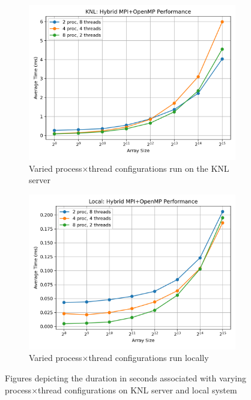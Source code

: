 \documentclass[11pt]{article}
\begin{document}
\begin{figure}
\centering
\begin{subfigure}[t]{0.48\textwidth}
  \centering
    \includegraphics[width=\textwidth]{./images/knlq7.png}
  \caption{Varied process$\times$thread configurations run on the KNL server}\label{fig:knlq7}
\end{subfigure}%
\hfill
\begin{subfigure}[t]{0.48\textwidth}
  \centering
    \includegraphics[width=\textwidth]{./images/localq7.png}
  \caption{Varied process$\times$thread configurations run locally}\label{fig:localq7}
\end{subfigure}%
\caption{Figures depicting the duration in seconds associated with varying process$\times$thread configurations on KNL server and local system}
\label{fig:q7}
\end{figure}
\end{document}

